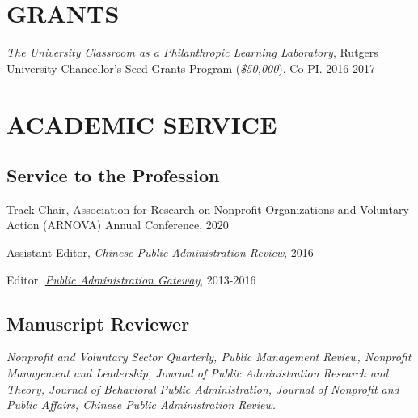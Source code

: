 \documentclass[letterpaper]{article}
\renewenvironment{itemize}{
  \begin{list}{}{
    \setlength{\leftmargin}{1.5em}
  }
}{
  \end{list}
}
\begin{document}
\bigskip


\section*{GRANTS}
\begin{itemize}
	
\item {\it The University Classroom as a Philanthropic Learning Laboratory}, Rutgers University Chancellor's Seed Grants Program ({\it \$50,000}), Co-PI. 2016-2017

\end{itemize}

\bigskip

\section*{ACADEMIC SERVICE}
\subsection*{Service to the Profession}
\begin{itemize}
	
\item Track Chair, Association for Research on Nonprofit Organizations and Voluntary Action (ARNOVA) Annual Conference, 2020

\item Assistant Editor, {\it Chinese Public Administration Review}, 2016-

\item Editor, \href{https://pagateway.newark.rutgers.edu/}{\it Public Administration Gateway}, 2013-2016

\end{itemize}

\subsection*{Manuscript Reviewer}
\begin{itemize}
	
\item {\it Nonprofit and Voluntary Sector Quarterly, Public Management Review, Nonprofit Management and Leadership, Journal of Public Administration Research and Theory, Journal of Behavioral Public Administration, Journal of Nonprofit and Public Affairs, Chinese Public Administration Review.}

\end{itemize}
\end{document}
